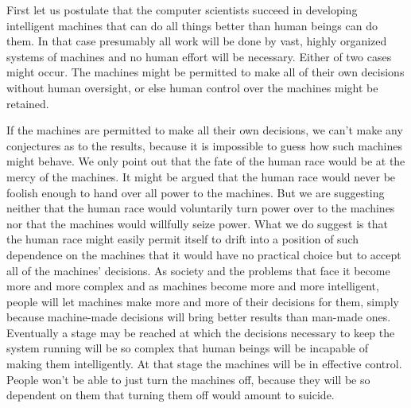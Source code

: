  First let us postulate that the computer scientists succeed in developing intelligent machines that can do all things better than human beings can do them. In that case presumably all work will be done by vast, highly organized systems of machines and no human effort will be necessary. Either of two cases might occur. The machines might be permitted to make all of their own decisions without human oversight, or else human control over the machines might be retained.

 If the machines are permitted to make all their own decisions, we can’t make any conjectures as to the results, because it is impossible to guess how such machines might behave. We only point out that the fate of the human race would be at the mercy of the machines. It might be argued that the human race would never be foolish enough to hand over all power to the machines. But we are suggesting neither that the human race would voluntarily turn power over to the machines nor that the machines would willfully seize power. What we do suggest is that the human race might easily permit itself to drift into a position of such dependence on the machines that it would have no practical choice but to accept all of the machines’ decisions. As society and the problems that face it become more and more complex and as machines become more and more intelligent, people will let machines make more and more of their decisions for them, simply because machine-made decisions will bring better results than man-made ones. Eventually a stage may be reached at which the decisions necessary to keep the system running will be so complex that human beings will be incapable of making them intelligently. At that stage the machines will be in effective control. People won’t be able to just turn the machines off, because they will be so dependent on them that turning them off would amount to suicide.

